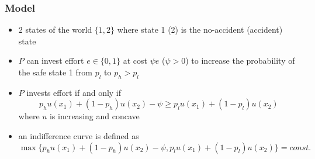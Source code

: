 \documentclass[11pt,english]{beamer}
\begin{document}
\begin{frame}[allowframebreaks]\frametitle{Model}
\label{sec-7-2}
\begin{itemize}

\item 2 states of the world $\{1,2\}$ where state 1 (2) is the no-accident (accident) state\\
\label{sec-7-2-1}%
\item $P$ can invest effort $e \in \{0,1\}$ at cost $\psi e$ ($\psi >0$) to increase the probability of the safe state 1 from $p_{l}$ to $p_{h}>p_{l}$\\
\label{sec-7-2-2}%
\item $P$ invests effort if and only if\\
\label{sec-7-2-3}%
\begin{equation}
    \label{eq:effort}
    p_h u(x_1)+(1-p_h)u(x_2) - \psi \geq p_l u(x_1)+(1-p_l)u(x_2)
  \end{equation}
where $u$ is increasing and concave

\item an indifference curve is defined as\\
\label{sec-7-2-4}%
\begin{equation}
    \label{eq:indiffcurve}
    \max\{p_h u(x_1)+(1-p_h)u(x_2) - \psi, p_l u(x_1)+(1-p_l)u(x_2)\}
    = const.
  \end{equation}


\end{itemize}
\end{frame}
\end{document}
